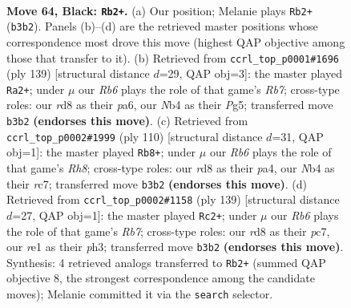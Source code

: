 \documentclass[11pt]{article}
\begin{document}
\clearpage

\begin{figure}[p]\centering
\begin{subfigure}{0.46\textwidth}\centering
\resizebox{\linewidth}{!}{%
\newchessgame
\chessboard[
  setfen={3R4/1p5p/1k4pP/p4p2/1n3P2/1r6/6K1/4R3 b - - 16 64},
  showmover=false,
  pgfstyle=straightmove, color=movearrow, markmove={b3-b2}
]}
\caption{}
\end{subfigure}\hfill
\begin{subfigure}{0.46\textwidth}\centering
\resizebox{\linewidth}{!}{%
\newchessgame
\chessboard[
  setfen={8/5k2/P4p2/5ppp/K1P5/6P1/1r6/4R3 b - - 2 70},
  showmover=false,
  pgfstyle=straightmove, color=movearrow, markmove={b2-a2}
]}
\caption{}
\end{subfigure}
\\[4pt]
\begin{subfigure}{0.46\textwidth}\centering
\resizebox{\linewidth}{!}{%
\newchessgame
\chessboard[
  setfen={7R/2r5/7P/1k1p1pp1/p2P4/4P1K1/5P2/8 w - - 1 56},
  showmover=false,
  pgfstyle=straightmove, color=movearrow, markmove={h8-b8}
]}
\caption{}
\end{subfigure}\hfill
\begin{subfigure}{0.46\textwidth}\centering
\resizebox{\linewidth}{!}{%
\newchessgame
\chessboard[
  setfen={8/2P2p2/2K1k1p1/6p1/8/5P1P/pr6/3R4 b - - 16 70},
  showmover=false,
  pgfstyle=straightmove, color=movearrow, markmove={b2-c2}
]}
\caption{}
\end{subfigure}
\caption{\textbf{Move 64, Black: \texttt{Rb2+}.} (a) Our position; Melanie plays \texttt{Rb2+} (\texttt{b3b2}). Panels (b)--(d) are the retrieved master positions whose correspondence most drove this move (highest QAP objective among those that transfer to it). (b) Retrieved from \texttt{ccrl\_top\_p0001\#1696} (ply 139) [structural distance $d$=29, QAP obj=3]: the master played \texttt{Ra2+}; under $\mu$ our \emph{Rb6} plays the role of that game's \emph{Rb7}; cross-type roles: our \emph{r}d8 as their \emph{p}a6, our \emph{N}b4 as their \emph{P}g5; transferred move \texttt{b3b2} \textbf{(endorses this move)}. (c) Retrieved from \texttt{ccrl\_top\_p0002\#1999} (ply 110) [structural distance $d$=31, QAP obj=1]: the master played \texttt{Rb8+}; under $\mu$ our \emph{Rb6} plays the role of that game's \emph{Rh8}; cross-type roles: our \emph{r}d8 as their \emph{p}a4, our \emph{N}b4 as their \emph{r}c7; transferred move \texttt{b3b2} \textbf{(endorses this move)}. (d) Retrieved from \texttt{ccrl\_top\_p0002\#1158} (ply 139) [structural distance $d$=27, QAP obj=1]: the master played \texttt{Rc2+}; under $\mu$ our \emph{Rb6} plays the role of that game's \emph{Rb7}; cross-type roles: our \emph{r}d8 as their \emph{p}c7, our \emph{r}e1 as their \emph{p}h3; transferred move \texttt{b3b2} \textbf{(endorses this move)}. Synthesis: 4 retrieved analogs transferred to \texttt{Rb2+} (summed QAP objective 8, the strongest correspondence among the candidate moves); Melanie committed it via the \texttt{search} selector.}
\label{fig:thought-m127}
\end{figure}
\end{document}
